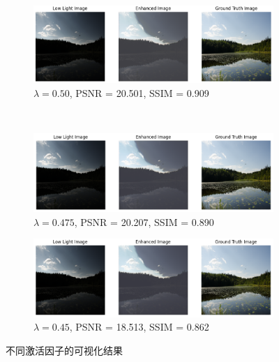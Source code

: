 \documentclass[a4paper]{ctexart}
\begin{document}
\begin{figure}[htbp]
\begin{subfigure}{0.45\textwidth}
				\includegraphics[width=\linewidth]{picture/LLIE/Experiment/myplot_skip_stem_lambda_0.50}
				\caption{$\lambda = 0.50$, PSNR = 20.501, SSIM = 0.909}
				\label{fig: lambda = 0.50}	
			\end{subfigure}\\
			\begin{subfigure}{0.45\textwidth}
				\includegraphics[width=\linewidth]{picture/LLIE/Experiment/myplot_skip_stem_lambda_0.475}
				\caption{$\lambda = 0.475$, PSNR = 20.207, SSIM = 0.890}
				\label{fig: lambda = 0.475}	
			\end{subfigure}
			\begin{subfigure}{0.45\textwidth}
				\includegraphics[width=\linewidth]{picture/LLIE/Experiment/myplot_skip_stem_lambda_0.45}
				\caption{$\lambda = 0.45$, PSNR = 18.513, SSIM = 0.862}
				\label{fig: lambda = 0.45}	
			\end{subfigure}
			\caption{
				\label{fig: skip connection}
				不同激活因子的可视化结果
			}
		\end{figure}
		
\end{document}
